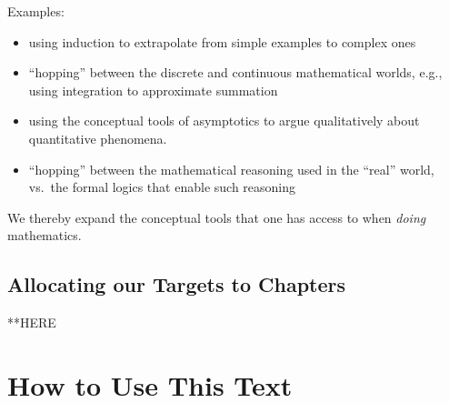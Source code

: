 \begin{enumerate}
{\small\sf Examples:}
\begin{itemize}
\item
using induction to extrapolate from simple examples to complex ones
\item
``hopping'' between the discrete and continuous mathematical worlds,
e.g., using integration to approximate summation
\item
using the conceptual tools of asymptotics to argue qualitatively about
quantitative phenomena.
\item
``hopping'' between the mathematical reasoning used in the ``real''
  world, vs.~the formal logics that enable such reasoning
\end{itemize}
We thereby expand the conceptual tools that one has access to when
{\em doing} mathematics.
\end{enumerate}

\subsection{Allocating our Targets to Chapters}
\label{sec:the chapters}

**HERE



\section{How to Use This Text}
\label{sec:how-to-use}





